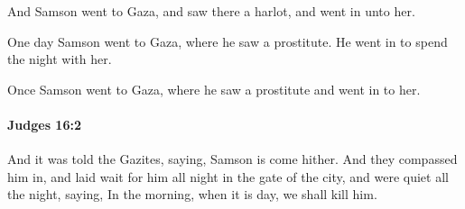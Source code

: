 			\begin{versebox}
					\item[BHS] 
					\item[ASV] And Samson went to Gaza, and saw there a harlot, and went in unto her.
					\item[NIV] One day Samson went to Gaza, where he saw a prostitute. He went in to spend the night with her.
					\item[NRSV] Once Samson went to Gaza, where he saw a prostitute and went in to her.
			\end{versebox}

		\paragraph{Judges 16:2} %
			\label{JUDGES-16-2}

			And it was told the Gazites, saying, Samson is come hither. And they compassed him in, and laid wait for him all night in the gate of the city, and were quiet all the night, saying, In the morning, when it is day, we shall kill him.

